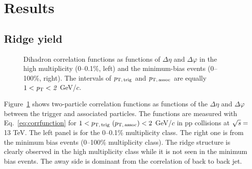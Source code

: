 
\section {Results}
\label{sec:results}

\subsection{Ridge yield}

\begin{figure}[h!]
	\centering
	\caption{ Dihadron correlation functions as functions of $\Delta\eta$ and $\Delta\varphi$ in the high multiplicity (0--0.1\%, left) and the minimum-bias events (0--100\%, right). The intervals of $p_\mathrm{T,\,trig}$ and $p_\mathrm{T,\,assoc}$ are equally $1 < \it{p}_{\rm{T}} < 2$ GeV/$c$. }
	\label{fig:PlotCorrMBHMT}
\end{figure}

Figure~\ref{fig:PlotCorrMBHMT} shows two-particle correlation functions as functions of the $\Delta \eta$ and $\Delta \varphi$ between the trigger and associated particles. The functions are measured with Eq.~\ref{eq:corrfunction} for $1 < p_\mathrm{T,\,trig}~\mathrm (p_\mathrm{T,\,assoc}) < 2$ GeV/$c$ in pp collisions at $\sqrt{\it{s}} = $\unit{13} {\rm{}TeV}. The left panel is for the 0--0.1\% multiplicity class. The right one is from the minimum bias events (0--100\% multiplicity class). The ridge structure is clearly observed in the high multiplicity class while it is not seen in the minimum bias events. The away side is dominant from the correlation of back to back jet.

